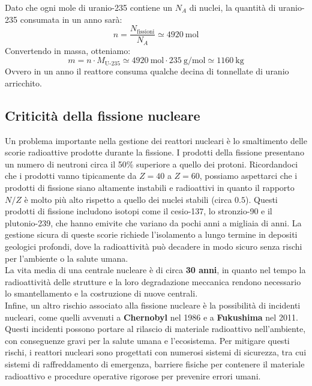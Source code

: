 Dato che ogni mole di uranio-235 contiene un $N_A$ di nuclei, la quantità di uranio-235 consumata in un anno sarà:
\begin{equation}
    n = \dfrac{N_{\text{fissioni}}}{N_A} \simeq \qty{4920}{\mol}
\end{equation}
Convertendo in massa, otteniamo:
\begin{equation}
    m = n \cdot M_{\text{U-235}} \simeq \qty{4920}{\mol} \cdot \qty{235}{\gram\per\mole} \simeq \qty{1160}{\kilo\gram}
\end{equation}
Ovvero in un anno il reattore consuma qualche decina di tonnellate di uranio arricchito.\\
\subsection{Criticità della fissione nucleare}
Un problema importante nella gestione dei reattori nucleari è lo smaltimento delle scorie radioattive prodotte durante la fissione. I prodotti della fissione presentano un numero di neutroni circa il 50\% superiore a quello dei protoni. Ricordandoci che i prodotti vanno tipicamente da $Z = 40$ a $Z = 60$, possiamo aspettarci che i prodotti di fissione siano altamente instabili e radioattivi in quanto il rapporto $N/Z$ è molto più alto rispetto a quello dei nuclei stabili (circa $0.5$). Questi prodotti di fissione includono isotopi come il cesio-137, lo stronzio-90 e il plutonio-239, che hanno emivite che variano da pochi anni a migliaia di anni. La gestione sicura di queste scorie richiede l'isolamento a lungo termine in depositi geologici profondi, dove la radioattività può decadere in modo sicuro senza rischi per l'ambiente o la salute umana.\\
La vita media di una centrale nucleare è di circa \textbf{30 anni}, in quanto nel tempo la radioattività delle strutture e la loro degradazione meccanica rendono necessario lo smantellamento e la costruzione di nuove centrali.\\
Infine, un altro rischio associato alla fissione nucleare è la possibilità di incidenti nucleari, come quelli avvenuti a \textbf{Chernobyl} nel 1986 e a \textbf{Fukushima} nel 2011. Questi incidenti possono portare al rilascio di materiale radioattivo nell'ambiente, con conseguenze gravi per la salute umana e l'ecosistema. Per mitigare questi rischi, i reattori nucleari sono progettati con numerosi sistemi di sicurezza, tra cui sistemi di raffreddamento di emergenza, barriere fisiche per contenere il materiale radioattivo e procedure operative rigorose per prevenire errori umani.\\

